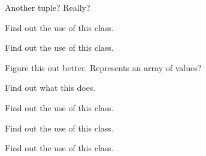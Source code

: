 \begin{DoxyRefList}
\label{todo__todo000023}%
%
Another tuple? Really?  
\item[Class \mbox{\hyperlink{classDim}{Dim}} ]\label{todo__todo000001}%
%
Find out the use of this class.  
\item[Class \mbox{\hyperlink{structeinsums_1_1All__t}{einsums\+::All\+\_\+t}} ]\label{todo__todo000007}%
%
Find out the use of this class.  
\item[Class \mbox{\hyperlink{structeinsums_1_1detail_1_1Array}{einsums\+::detail\+::Array$<$ T, Rank, Underlying\+Type $>$}} ]\label{todo__todo000009}%
%
Figure this out better. Represents an array of values?  
\item[Class \mbox{\hyperlink{structeinsums_1_1tensor__algebra_1_1Indices}{einsums\+::tensor\+\_\+algebra\+::Indices$<$ Args $>$}} ]\label{todo__todo000030}%
%
Find out what this does.  
\item[Class \mbox{\hyperlink{classOffset}{Offset}} ]\label{todo__todo000003}%
%
Find out the use of this class.  
\item[Class \mbox{\hyperlink{classRange}{Range}} ]\label{todo__todo000005}%
%
Find out the use of this class.  
\item[Class \mbox{\hyperlink{classStride}{Stride}} ]\label{todo__todo000002}%
%
Find out the use of this class. 
\end{DoxyRefList}